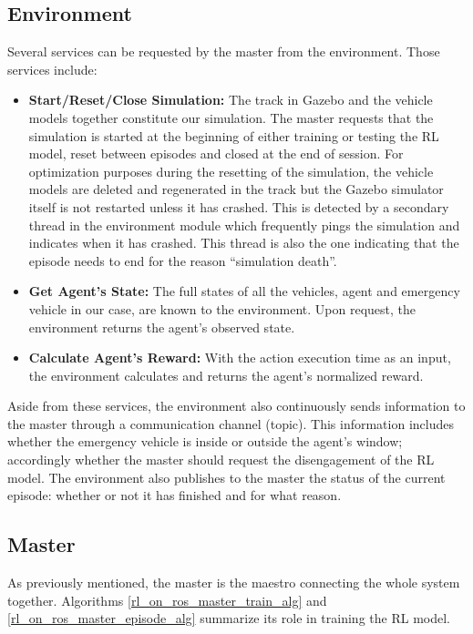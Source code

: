 \subsection{Environment}
    Several services can be requested by the master from the environment. Those services include:
        \begin{itemize}
        \item \textbf{Start/Reset/Close Simulation:} The track in Gazebo and the vehicle models together constitute our simulation. The master requests that the simulation is started at the beginning of either training or testing the RL model, reset between episodes and closed at the end of session. For optimization purposes during the resetting of the simulation, the vehicle models are deleted and regenerated in the track but the Gazebo simulator itself is not restarted unless it has crashed. This is detected by a secondary thread in the environment module which frequently pings the simulation and indicates when it has crashed. This thread is also the one indicating that the episode needs to end for the reason “simulation death”.
        \item \textbf{Get Agent’s State:} The full states of all the vehicles, agent and emergency vehicle in our case, are known to the environment. Upon request, the environment returns the agent’s observed state.
        \item \textbf{Calculate Agent’s Reward:} With the action execution time as an input, the environment calculates and returns the agent’s normalized reward.
        \end{itemize}
        Aside from these services, the environment also continuously sends information to the master through a communication channel (topic). This information includes whether the emergency vehicle is inside or outside the agent’s window; accordingly whether the master should request the disengagement of the RL model. The environment also publishes to the master the status of the current episode: whether or not it has finished and for what reason.
        
\subsection{Master}
    As previously mentioned, the master is the maestro connecting the whole system together. Algorithms \ref{rl_on_ros_master_train_alg} and \ref{rl_on_ros_master_episode_alg} summarize its role in training the RL model. \\
    
